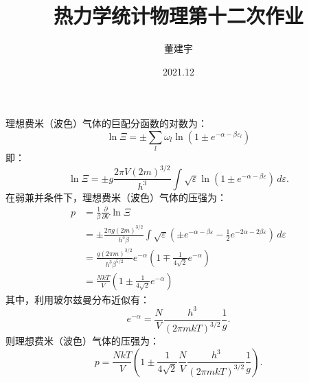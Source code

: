 \documentclass[a4paper,12pt]{article}
\title{热力学统计物理第十二次作业}
\date{2021.12}
\author{董建宇}
\begin{document}
\maketitle 

\titleformat{\section}[hang]{\large}{\thesection}{0.8em}{}{}
\titleformat{\subsection}[hang]{\small}{\thesubsection}{0.8em}{}{}

\section{}
理想费米（波色）气体的巨配分函数的对数为：
\begin{equation*}
	\ln \Xi = \pm \sum_l \omega_l \ln\left( 1 \pm e^{-\alpha-\beta\varepsilon_l} \right)
\end{equation*}
即：
\begin{equation*}
	\ln \Xi = \pm g \frac{2\pi V (2m)^{3/2}}{h^3} \int \sqrt{\varepsilon} \ln\left( 1 \pm e^{-\alpha-\beta\varepsilon} \right)\,d\varepsilon .
\end{equation*}
在弱兼并条件下，理想费米（波色）气体的压强为：
\begin{equation*}
\begin{aligned}
	p &= \frac{1}{\beta}\frac{\partial}{\partial V}\ln \Xi \\
	&= \pm \frac{2\pi g(2m)^{3/2}}{h^3\beta} \int \sqrt{\varepsilon} \left( \pm e^{-\alpha-\beta\varepsilon} - \frac{1}{2}e^{-2\alpha-2\beta\varepsilon} \right) \,d\varepsilon \\
	&= \frac{g(2\pi m)^{3/2}}{h^3\beta^{5/2}} e^{-\alpha} \left( 1 \mp \frac{1}{4\sqrt{2}}e^{-\alpha} \right) \\
	&= \frac{NkT}{V} \left( 1 \pm \frac{1}{4\sqrt{2}}e^{-\alpha} \right)
\end{aligned}
\end{equation*}
其中，利用玻尔兹曼分布近似有：
\begin{equation*}
	e^{-\alpha} = \frac{N}{V} \frac{h^3}{(2\pi m kT)^{3/2}} \frac{1}{g}.
\end{equation*}
则理想费米（波色）气体的压强为：
\begin{equation*}
	p = \frac{NkT}{V} \left( 1 \pm \frac{1}{4\sqrt{2}}\frac{N}{V} \frac{h^3}{(2\pi m kT)^{3/2}} \frac{1}{g} \right).
\end{equation*}
\end{document}
